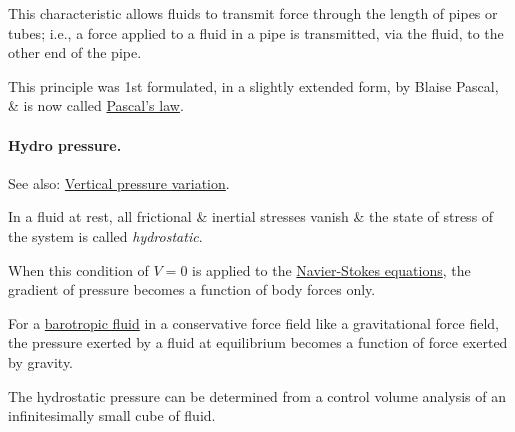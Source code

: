 \documentclass{article}
\begin{document}
This characteristic allows fluids to transmit force through the length of pipes or tubes; i.e., a force applied to a fluid in a pipe is transmitted, via the fluid, to the other end of the pipe.

This principle was 1st formulated, in a slightly extended form, by Blaise Pascal, \& is now called \href{https://en.wikipedia.org/wiki/Pascal's_law}{Pascal's law}.

\paragraph{Hydro pressure.} See also: \href{https://en.wikipedia.org/wiki/Vertical_pressure_variation}{Vertical pressure variation}.

%
In a fluid at rest, all frictional \& inertial stresses vanish \& the state of stress of the system is called {\it hydrostatic}.

When this condition of $V = 0$ is applied to the \href{https://en.wikipedia.org/wiki/Navier-Stokes_equations}{Navier-Stokes equations}, the gradient of pressure becomes a function of body forces only.

For a \href{https://en.wikipedia.org/wiki/Barotropic_fluid}{barotropic fluid} in a conservative force field like a gravitational force field, the pressure exerted by a fluid at equilibrium becomes a function of force exerted by gravity.

%
The hydrostatic pressure can be determined from a control volume analysis of an infinitesimally small cube of fluid.
\end{document}
